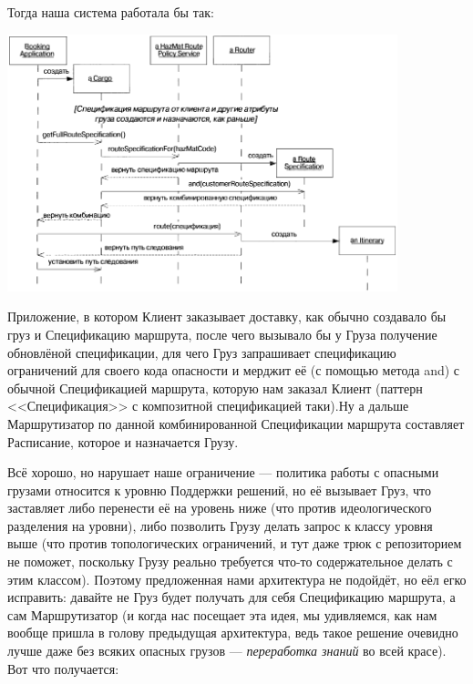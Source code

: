 \documentclass{../../text-style}
\begin{document}
Тогда наша система работала бы так:

\begin{center}
    \includegraphics[width=0.85\textwidth]{cargoHazMatWrongSequence.png}
\end{center}

Приложение, в котором Клиент заказывает доставку, как обычно создавало бы груз и Спецификацию маршрута, после чего вызывало бы у Груза получение обновлёной спецификации, для чего Груз запрашивает спецификацию ограничений для своего кода опасности и мерджит её (с помощью метода and) с обычной Спецификацией маршрута, которую нам заказал Клиент (паттерн <<Спецификация>> с композитной спецификацией таки).Ну а дальше Маршрутизатор по данной комбинированной Спецификации маршрута составляет Расписание, которое и назначается Грузу.

Всё хорошо, но нарушает наше ограничение --- политика работы с опасными грузами относится к уровню Поддержки решений, но её вызывает Груз, что заставляет либо перенести её на уровень ниже (что против идеологического разделения на уровни), либо позволить Грузу делать запрос к классу уровня выше (что против топологических ограничений, и тут даже трюк с репозиторием не поможет, поскольку Грузу реально требуется что-то содержательное делать с этим классом). Поэтому предложенная нами архитектура не подойдёт, но еёл егко исправить: давайте не Груз будет получать для себя Спецификацию маршрута, а сам Маршрутизатор (и когда нас посещает эта идея, мы удивляемся, как нам вообще пришла в голову предыдущая архитектура, ведь такое решение очевидно лучше даже без всяких опасных грузов --- \textit{переработка знаний} во всей красе). Вот что получается:
\end{document}
